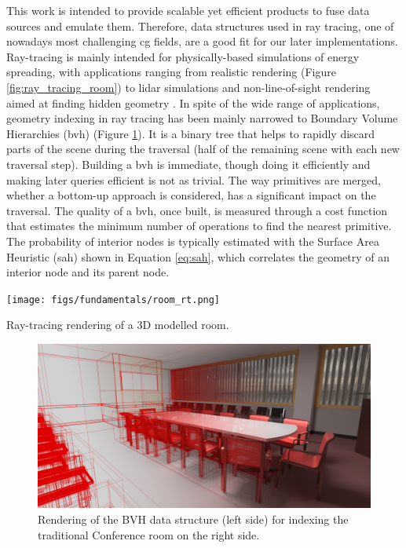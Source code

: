 This work is intended to provide scalable yet efficient products to fuse data sources and emulate them. Therefore, data structures used in ray tracing, one of nowadays most challenging \acrshort{cg} fields, are a good fit for our later implementations. Ray-tracing is mainly intended for physically-based simulations of energy spreading, with applications ranging from realistic rendering (Figure \ref{fig:ray_tracing_room}) to \acrshort{lidar} simulations and non-line-of-sight rendering aimed at finding hidden geometry \cite{royo_non-line--sight_2022}. In spite of the wide range of applications, geometry indexing in ray tracing has been mainly narrowed to Boundary Volume Hierarchies (\acrshort{bvh}) \cite{meister_survey_2021} (Figure \ref{fig:bvh_raytracing}). It is a binary tree that helps to rapidly discard parts of the scene during the traversal (half of the remaining scene with each new traversal step). Building a \acrshort{bvh} is immediate, though doing it efficiently and making later queries efficient is not as trivial. The way primitives are merged, whether a bottom-up approach is considered, has a significant impact on the traversal. The quality of a \acrshort{bvh}, once built, is measured through a cost function that estimates the minimum number of operations to find the nearest primitive. The probability of interior nodes is typically estimated with the Surface Area Heuristic (\acrshort{sah}) shown in Equation \ref{eq:sah}, which correlates the geometry of an interior node and its parent node. 
\begin{marginfigure}[-5.0cm]
    \texttt{[image: figs/fundamentals/room\_rt.png]}
	\caption{Ray-tracing rendering of a 3D modelled room. }
    \label{fig:ray_tracing_room}
\end{marginfigure}

\begin{figure}[ht]
	\includegraphics[width=\textwidth]{figs/fundamentals/bvh_raytracing.png}
	\caption{Rendering of the BVH data structure (left side) for indexing the traditional Conference room \cite{mcguire_computer_2017} on the right side. }
    \label{fig:bvh_raytracing}
\end{figure}

